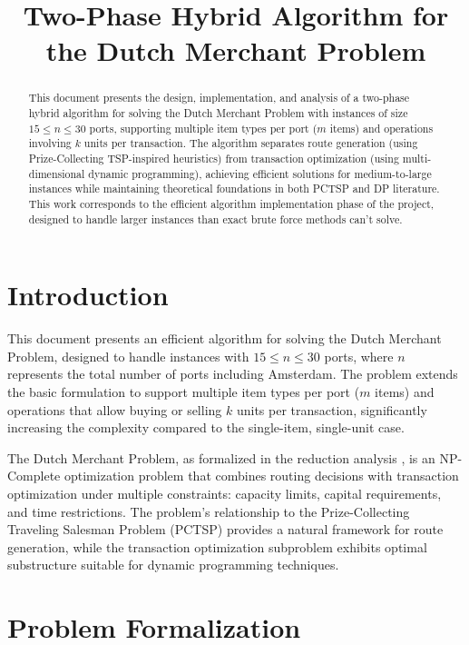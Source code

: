 \documentclass[12pt]{article}
\title{Two-Phase Hybrid Algorithm for the Dutch Merchant Problem}
\author{}
\date{}
\begin{document}
\maketitle

\begin{abstract}
This document presents the design, implementation, and analysis of a two-phase hybrid algorithm for solving the Dutch Merchant Problem with instances of size $15 \leq n \leq 30$ ports, supporting multiple item types per port ($m$ items) and operations involving $k$ units per transaction. The algorithm separates route generation (using Prize-Collecting TSP-inspired heuristics) from transaction optimization (using multi-dimensional dynamic programming), achieving efficient solutions for medium-to-large instances while maintaining theoretical foundations in both PCTSP and DP literature. This work corresponds to the efficient algorithm implementation phase of the project, designed to handle larger instances than exact brute force methods can't solve.
\end{abstract}

\section{Introduction}
\label{sec:introduction}

This document presents an efficient algorithm for solving the Dutch Merchant Problem, designed to handle instances with $15 \leq n \leq 30$ ports, where $n$ represents the total number of ports including Amsterdam. The problem extends the basic formulation to support multiple item types per port ($m$ items) and operations that allow buying or selling $k$ units per transaction, significantly increasing the complexity compared to the single-item, single-unit case.

The Dutch Merchant Problem, as formalized in the reduction analysis \cite{reduccion2025}, is an NP-Complete optimization problem that combines routing decisions with transaction optimization under multiple constraints: capacity limits, capital requirements, and time restrictions. The problem's relationship to the Prize-Collecting Traveling Salesman Problem (PCTSP) \cite{MarchettiSpaccamela2007PrizeCollectingTS} provides a natural framework for route generation, while the transaction optimization subproblem exhibits optimal substructure suitable for dynamic programming techniques.

\section{Problem Formalization}
\label{sec:formalization}
\end{document}
